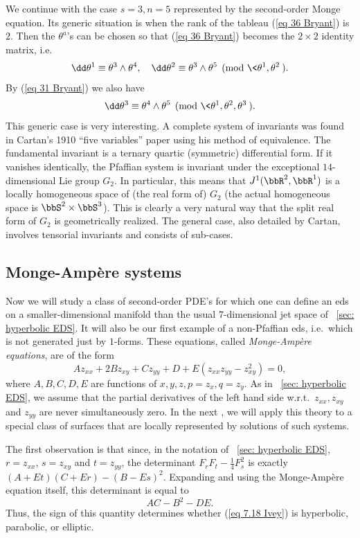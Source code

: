 We continue with the case $s=3,n=5$ represented by the second-order Monge equation. Its generic situation is when the rank of the tableau (\ref{eq 36 Bryant}) is $2$. Then the $\theta^a$'s can be chosen so that (\ref{eq 36 Bryant}) becomes the $2\times 2$ identity matrix, i.e.\ 
\[\dd\theta^1\equiv \theta^3\wedge\theta^4,\quad\dd\theta^2\equiv \theta^3\wedge\theta^5 \pmod{\<\theta^1,\theta^2\>}.\]
By (\ref{eq 31 Bryant}) we also have 
\[\dd\theta^3\equiv \theta^4\wedge\theta^5 \pmod{\<\theta^1,\theta^2,\theta^3\>}.\]
This generic case is very interesting. A complete system of invariants was found in Cartan's 1910 ``five variables'' paper using his method of equivalence. The fundamental invariant is a ternary quartic (symmetric) differential form. If it vanishes identically, the Pfaffian system is invariant under the exceptional $14$-dimensional Lie group $G_2$. In particular, this means that $J^1(\bbR^2,\bbR^1)$ is a locally homogeneous space of (the real form of) $G_2$ (the actual homogeneous space is $\bbS^2\times\bbS^3$). This is clearly a very natural way that the split real form of $G_2$ is geometrically realized. The general case, also detailed by Cartan, involves tensorial invariants and consists of sub-cases.






\subsection{Monge-Amp\`ere systems}


Now we will study a class of second-order PDE's for which one can define an \gls{eds} on a smaller-dimensional manifold than the usual $7$-dimensional jet space of \subsect~\ref{sec: hyperbolic EDS}. It will also be our first example of a non-Pfaffian \gls{eds}, i.e.\ which is not generated just by $1$-forms. These equations, called \emph{Monge-Amp\`ere equations}, are of the form 
\[Az_{xx}+2Bz_{xy}+Cz_{yy}+D+E(z_{xx}z_{yy}-z_{xy}^2)=0,\label{eq 7.18 Ivey}\]
where $A,B,C,D,E$ are functions of $x,y,z,p=z_x,q=z_y$. As in \subsect~\ref{sec: hyperbolic EDS}, we assume that the partial derivatives of the left hand side w.r.t.\ $z_{xx},z_{xy}$ and $z_{yy}$ are never simultaneously zero. In the next \subsect, we will apply this theory to a special class of surfaces that are locally represented by solutions of such systems.

The first observation is that since, in the notation of \subsect~\ref{sec: hyperbolic EDS}, $r=z_{xx}$, $s=z_{xy}$ and $t=z_{yy}$, the determinant $F_rF_t-\frac14 F_s^2$ is exactly $(A+Et)(C+Er)-(B-Es)^2$. Expanding and using the Monge-Amp\`ere equation itself, this determinant is equal to
\[AC-B^2-DE.\]
Thus, the sign of this quantity determines whether (\ref{eq 7.18 Ivey}) is hyperbolic, parabolic, or elliptic.

